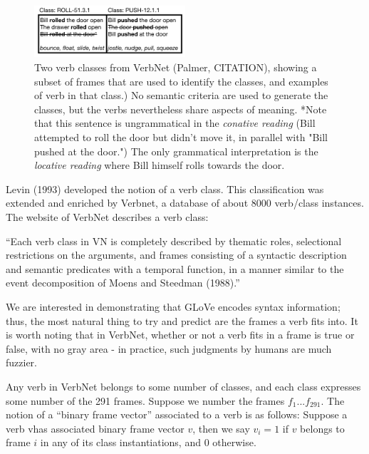\documentclass[a4paper]{article}
\begin{document}
\begin{figure}[H]
\centering
\includegraphics[width=0.5\textwidth]{VerbTable.png}
\caption{\label{fig:frog} Two verb classes from VerbNet (Palmer, CITATION), showing a subset of frames that are used to identify the classes, and examples of verb in that class.) No semantic criteria are used to generate the classes, but the verbs nevertheless share aspects of meaning.  *Note that this sentence is ungrammatical in the \emph{conative reading} (Bill attempted to roll the door but didn't move it, in parallel with "Bill pushed at the door.") The only grammatical interpretation is the \emph{locative reading} where Bill himself rolls towards the door. }
\end{figure}


Levin (1993) developed the notion of a verb class. This classification was extended and enriched by Verbnet, a database of about 8000 verb/class instances. The website of VerbNet describes a verb class:

\begin{displayquote}
“Each verb class in VN is completely described by thematic roles, selectional restrictions on the arguments, and frames consisting of a syntactic description and semantic predicates with a temporal function, in a manner similar to the event decomposition of Moens and Steedman (1988).”
\end{displayquote}

We are interested in demonstrating that GLoVe encodes syntax information; thus, the most natural thing to try and predict are the frames a verb fits into. It is worth noting that in VerbNet, whether or not a verb fits in a frame is true or false, with no gray area - in practice, such judgments by humans are much fuzzier. 


Any verb in VerbNet belongs to some number of classes, and each class expresses some number of the 291 frames. Suppose we number the frames $f_1... f_{291}$. The notion of a “binary frame vector” associated to a verb is as follows: Suppose a verb vhas associated binary frame vector $v$, then we say 
$v_i =1$ if $v$ belongs to frame $i$ in any of its class instantiations, and 0 otherwise.
\end{document}
